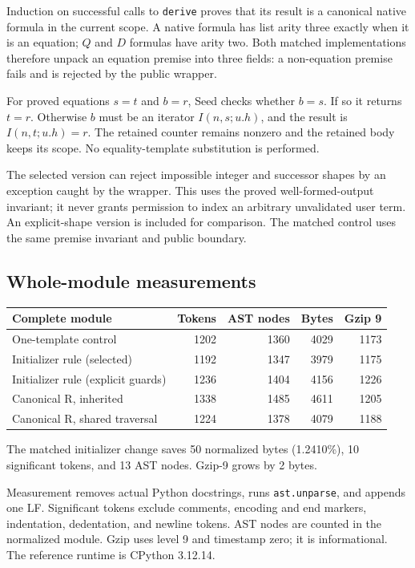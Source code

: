 \documentclass[11pt,a4paper]{article}
\theoremstyle{definition}
\begin{document}
Induction on successful calls to \texttt{derive} proves that its
result is a canonical native formula in the current scope. A native
formula has list arity three exactly when it is an equation;
\(Q\) and \(D\) formulas have arity two. Both matched implementations
therefore unpack an equation premise into three fields: a non-equation
premise fails and is rejected by the public wrapper.

For proved equations \(s=t\) and \(b=r\), Seed checks whether \(b=s\).
If so it returns \(t=r\). Otherwise \(b\) must be an iterator
\(I(n,s;u.h)\), and the result is \(I(n,t;u.h)=r\).
The retained counter remains nonzero and the retained body keeps its
scope. No equality-template substitution is performed.

The selected version can reject impossible integer and successor
shapes by an exception caught by the wrapper. This uses the proved
well-formed-output invariant; it never grants permission to index an
arbitrary unvalidated user term. An explicit-shape version is included
for comparison. The matched control uses the same premise invariant
and public boundary.

\subsection{Whole-module measurements}

\begin{center}
\small
\begin{tabular}{@{}lrrrr@{}}
\toprule
Complete module & Tokens & AST nodes & Bytes & Gzip 9\\
\midrule
One-template control & 1202 & 1360 & 4029 & 1173\\
Initializer rule (selected) & 1192 & 1347 & 3979 & 1175\\
Initializer rule (explicit guards) & 1236 & 1404 & 4156 & 1226\\
Canonical R, inherited & 1338 & 1485 & 4611 & 1205\\
Canonical R, shared traversal & 1224 & 1378 & 4079 & 1188\\
\bottomrule
\end{tabular}
\end{center}
The matched initializer change saves 50 normalized bytes (1.2410\%), 10 significant tokens, and 13 AST nodes. Gzip-9 grows by 2 bytes.


Measurement removes actual Python docstrings, runs \texttt{ast.unparse},
and appends one LF. Significant tokens exclude comments, encoding and
end markers, indentation, dedentation, and newline tokens. AST nodes
are counted in the normalized module. Gzip uses level 9 and timestamp
zero; it is informational. The reference runtime is CPython 3.12.14.
\end{document}
